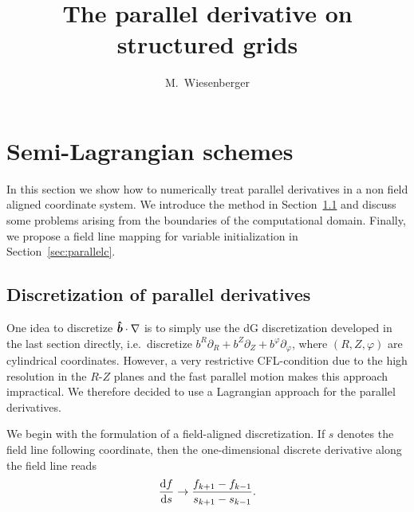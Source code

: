 






\title{The parallel derivative on structured grids}
\author{M.~Wiesenberger}
 
\maketitle
\section{Semi-Lagrangian schemes} \label{sec:parallel}
In this section we show how to numerically treat parallel derivatives in a non field
aligned coordinate system.
We introduce the method in Section~\ref{sec:parallela} %
and discuss some problems arising from the boundaries of the computational domain.
Finally, we propose a field line mapping for variable initialization in Section~\ref{sec:parallelc}.

\subsection{Discretization of parallel derivatives} \label{sec:parallela}
One idea to discretize $\bm{\hat{b}}\cdot\nabla$ is to simply use 
the dG discretization developed in the last section directly, i.e.~discretize $b^R\partial_R+b^Z\partial_Z+b^\varphi\partial_\varphi$, where $(R,Z,\varphi)$ are cylindrical coordinates. 
However, a very restrictive CFL-condition due to the high resolution
in the $R$-$Z$ planes and the fast parallel motion makes 
this approach impractical. We therefore decided to use a 
Lagrangian approach for the parallel derivatives.

We begin with the formulation of a field-aligned discretization. If $s$ denotes the 
field line following coordinate, then the one-dimensional discrete derivative along the field line reads
\begin{align}
    \frac{\mathrm{d} f }{\mathrm{d} s} \rightarrow \frac{f_{k+1}-f_{k-1}}{s_{k+1} - s_{k-1}}.
    \label{eq:proposition}
\end{align}

